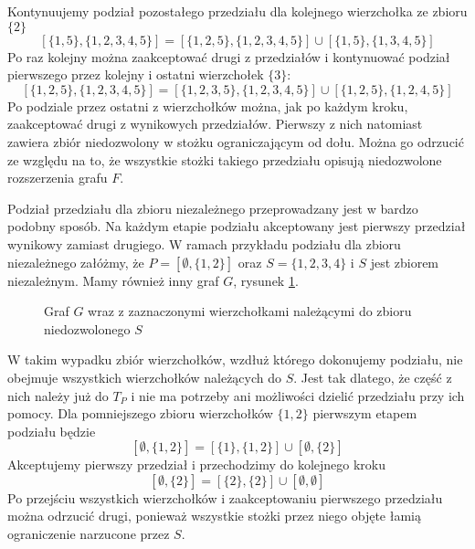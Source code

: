 Kontynuujemy podział pozostałego przedziału dla kolejnego wierzchołka ze zbioru $\{2\}$
$$[\{1,5\},\{1,2,3,4,5\}] = [\{1,2,5\},\{1,2,3,4,5\}] \cup [\{1,5\},\{1,3,4,5\}]$$ 
Po raz kolejny można zaakceptować drugi z przedziałów i kontynuować podział pierwszego przez kolejny i ostatni wierzchołek $\{3\}$: 
$$[\{1,2,5\},\{1,2,3,4,5\}] = [\{1,2,3,5\},\{1,2,3,4,5\}] \cup [\{1,2,5\},\{1,2,4,5\}]$$
Po podziale przez ostatni z wierzchołków można, jak po każdym kroku, zaakceptować drugi z wynikowych przedziałów. Pierwszy z nich natomiast zawiera zbiór niedozwolony w stożku ograniczającym od dołu. Można go odrzucić ze względu na to, że wszystkie stożki takiego przedziału opisują niedozwolone rozszerzenia grafu $F$.

Podział przedziału dla zbioru niezależnego przeprowadzany jest w bardzo podobny sposób. Na każdym etapie podziału akceptowany jest pierwszy przedział wynikowy zamiast drugiego. W ramach przykładu podziału dla zbioru niezależnego załóżmy, że 
$P = [\emptyset,\{1,2\}]$ oraz $S = \{1,2,3,4\}$ i $S$ jest zbiorem niezależnym. Mamy również inny graf $G$, rysunek \ref{roszerzenieN}.
\begin{figure}[H]
  \centering
    \caption{Graf $G$ wraz z zaznaczonymi wierzchołkami należącymi do zbioru niedozwolonego $S$}
    \label{roszerzenieN}
 \end{figure}
 

W takim wypadku zbiór wierzchołków, wzdłuż którego dokonujemy podziału, nie obejmuje wszystkich wierzchołków należących do $S$. Jest tak dlatego, że część z nich należy już do $T_P$ i nie ma potrzeby ani możliwości dzielić przedziału przy ich pomocy. Dla pomniejszego zbioru wierzchołków $\{1,2\}$ pierwszym etapem podziału będzie 
$$[{\emptyset},\{1,2\}]= [\{1\},\{1,2\}] \cup [{\emptyset},\{2\}]$$ Akceptujemy pierwszy przedział i przechodzimy do kolejnego kroku
$$ [{\emptyset},\{2\}]= [\{2\},\{2\}] \cup [{\emptyset},{\emptyset}]$$ Po przejściu wszystkich wierzchołków i zaakceptowaniu pierwszego przedziału można odrzucić drugi, ponieważ wszystkie stożki przez niego objęte łamią ograniczenie narzucone przez $S$.


